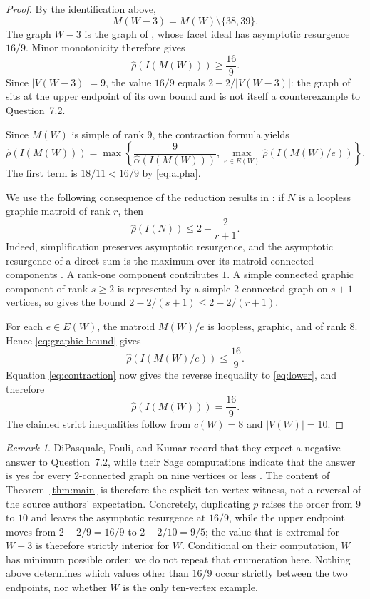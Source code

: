 \documentclass[11pt]{amsart}
\theoremstyle{remark}
\newtheorem*{remark}{Remark}
\newcommand{\ahat}{\widehat{\alpha}}
\newcommand{\rhat}{\widehat{\rho}}
\begin{document}
\begin{proof}
By the identification above,
\[
M(W-3)=M(W)\setminus\{38,39\}.
\]
The graph $W-3$ is the graph of \cite[Example~6.1]{DFK}, whose facet
ideal has asymptotic resurgence $16/9$. Minor monotonicity
\cite[Proposition~2.4]{DFK} therefore gives
\begin{equation}\label{eq:lower}
\rhat(I(M(W)))\ge\frac{16}{9}.
\end{equation}
Since $|V(W-3)|=9$, the value $16/9$ equals $2-2/|V(W-3)|$: the graph
of \cite[Example~6.1]{DFK} sits at the upper endpoint of its own bound
and is not itself a counterexample to Question~7.2.

Since $M(W)$ is simple of rank $9$, the contraction formula
\cite[Theorem~2.5]{DFK} yields
\begin{equation}\label{eq:contraction}
\rhat(I(M(W)))
=
\max\left\{
\frac{9}{\ahat(I(M(W)))},
\max_{e\in E(W)}\rhat(I(M(W)/e))
\right\}.
\end{equation}
The first term is $18/11<16/9$ by \eqref{eq:alpha}.

We use the following consequence of the reduction results in
\cite{DFK}: if $N$ is a loopless graphic matroid of rank $r$, then
\begin{equation}\label{eq:graphic-bound}
\rhat(I(N))\le 2-\frac{2}{r+1}.
\end{equation}
Indeed, simplification preserves asymptotic resurgence, and the
asymptotic resurgence of a direct sum is the maximum over its
matroid-connected components \cite[Theorems~3.2 and~3.3]{DFK}. A
rank-one component contributes $1$. A simple connected graphic
component of rank $s\ge2$ is represented by a simple $2$-connected
graph on $s+1$ vertices, so \cite[Theorem~5.5]{DFK} gives the bound
$2-2/(s+1)\le 2-2/(r+1)$.

For each $e\in E(W)$, the matroid $M(W)/e$ is loopless, graphic, and
of rank $8$. Hence \eqref{eq:graphic-bound} gives
\[
\rhat(I(M(W)/e))\le\frac{16}{9}.
\]
Equation \eqref{eq:contraction} now gives the reverse inequality to
\eqref{eq:lower}, and therefore
\[
\rhat(I(M(W)))=\frac{16}{9}.
\]
The claimed strict inequalities follow from $c(W)=8$ and
$|V(W)|=10$.
\end{proof}

\begin{remark}
DiPasquale, Fouli, and Kumar record that they expect a negative answer
to Question~7.2, while their Sage computations indicate that the answer
is yes for every $2$-connected graph on nine vertices or less
\cite[Table~1 and the discussion following Question~7.2]{DFK}. The
content of Theorem~\ref{thm:main} is therefore the explicit ten-vertex
witness, not a reversal of the source authors' expectation. Concretely,
duplicating $p$ raises the order from $9$ to $10$ and leaves the
asymptotic resurgence at $16/9$, while the upper endpoint moves from
$2-2/9=16/9$ to $2-2/10=9/5$; the value that is extremal for $W-3$ is
therefore strictly interior for $W$. Conditional
on their computation, $W$ has minimum possible order; we do not repeat
that enumeration here. Nothing above determines which values other than
$16/9$ occur strictly between the two endpoints, nor whether $W$ is the
only ten-vertex example.
\end{remark}
\end{document}
